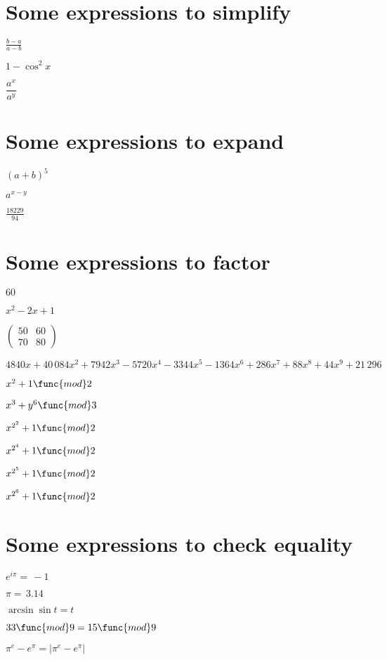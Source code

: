 \documentclass{article}
\begin{document}
\section{Some expressions to simplify}

$\frac{b-a}{a-b}$

$1-\cos ^{2}x$

$\dfrac{a^{x}}{a^{y}}$

\section{Some expressions to expand}

$\left( a+b\right) ^{5}$

$a^{x-y}$

$\frac{18229}{94}$

\section{Some expressions to factor}

$60$

$x^{2}-2x+1$

$\left( 
\begin{array}{cc}
50 & 60 \\ 
70 & 80%
\end{array}%
\right) $

$4840x+40%
\,084x^{2}+7942x^{3}-5720x^{4}-3344x^{5}-1364x^{6}+286x^{7}+88x^{8}+44x^{9}+21\,296 
$

$x^{2}+1\func{mod}2$

$x^{3}+y^{6}\func{mod}3$

$x^{2^{2}}+1\func{mod}2$

$x^{2^{4}}+1\func{mod}2$

$x^{2^{5}}+1\func{mod}2$

$x^{2^{6}}+1\func{mod}2$

\section{Some expressions to check equality}

$e^{i\pi }=\,-1$

$\pi =\,3.14$

$\arcsin \sin t=t$

$33\func{mod}9=15\func{mod}9$

$\pi ^{e}-e^{\pi }=\left\vert \pi ^{e}-e^{\pi }\right\vert $
\end{document}
